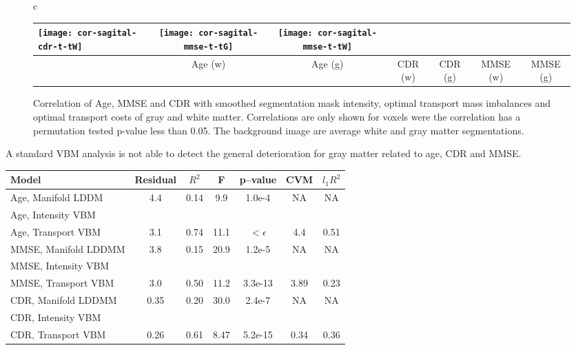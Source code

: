 \documentclass{llncs}
\begin{document}
\begin{figure}[bth]
\begin{tabular}{c}
\begin{tabular}{l|cc|cc|cc}
\texttt{[image: cor-sagital-cdr-t-tW]} &
\texttt{[image: cor-sagital-mmse-t-tG]} &
\texttt{[image: cor-sagital-mmse-t-tW]} \\ \hline \hline
%
& \parbox[b][4mm]{12mm}{Age (w)} 
& \parbox[b][4mm]{12mm}{Age (g)} 
& \parbox[b][4mm]{14mm}{CDR (w)} 
& \parbox[b][4mm]{14mm}{CDR (g) }
& \parbox[b][4mm]{18mm}{MMSE (w)}
& \parbox[b][4mm]{18mm}{MMSE (g)}
\end{tabular}
\end{tabular}
\caption{\label{fig:cor-oasis-gray}
Correlation of Age, MMSE and CDR with smoothed segmentation mask intensity,
optimal transport mass imbalances and optimal transport costs of gray and white
matter.  Correlations are only shown for voxels were the correlation has a
permutation tested p-value less than 0.05. The background image are average
white and gray matter segmentations. 
} 
\end{figure} \endgroup
A standard VBM analysis is not able to detect the general deterioration for
gray matter related to age, CDR and MMSE.



\begin{table}
\centering
\scriptsize
\begin{tabular}{l|cccc|cc}
\parbox[2mm]{40mm}{Model}  & 
\parbox[2mm]{12mm}{\centering Residual} & 
\parbox[2mm]{8mm}{\centering $R^2$} & 
\parbox[2mm]{8mm}{\centering F}   & 
\parbox[2mm]{12mm}{\centering p--value}   & 
\parbox[2mm]{8mm}{\centering CVM }  & 
\parbox[2mm]{8mm}{\centering $l_1 R^2$} 
        \\ \hline \hline
Age, Manifold LDDM   & 4.4  & 0.14  & 9.9  & 1.0e-4      & NA    & NA  \\
Age, Intensity VBM   &      &       &      &             &       &     \\
Age, Transport VBM   & 3.1  & 0.74  & 11.1 & $<\epsilon$ & 4.4   & 0.51   \\ \hline
MMSE, Manifold LDDMM & 3.8  & 0.15  & 20.9 & 1.2e-5      & NA    & NA  \\
MMSE, Intensity VBM  &      &       &      &             &       &     \\
MMSE, Transport VBM  & 3.0  & 0.50  & 11.2 & 3.3e-13     & 3.89  & 0.23  \\ \hline
CDR, Manifold LDDMM  & 0.35 & 0.20  & 30.0 & 2.4e-7      & NA    & NA  \\
CDR, Intensity VBM   &      &       &      &             &       &     \\
CDR, Transport VBM   & 0.26 & 0.61  & 8.47 & 5.2e-15     & 0.34  & 0.36    \\
\end{tabular}
\end{table}
\end{document}
